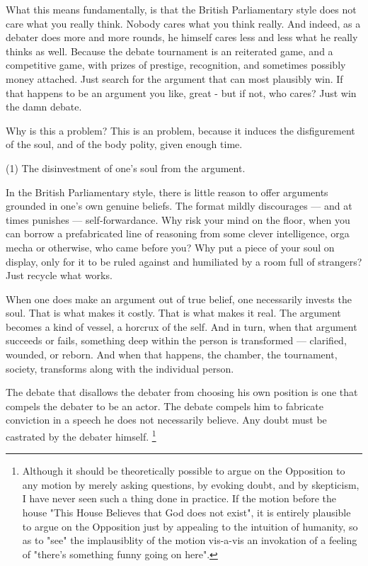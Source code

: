 \begin{itemize}
    What this means fundamentally, is that the British Parliamentary style does not care what you really think. Nobody cares what you think really. And indeed, as a debater does more and more rounds, he himself cares less and less what he really thinks as well. Because the debate tournament is an reiterated game, and a competitive game, with prizes of prestige, recognition, and sometimes possibly money attached. Just search for the argument that can most plausibly win. If that happens to be an argument you like, great - but if not, who cares? Just win the damn debate.
    
    Why is this a problem? This is an problem, because it induces the disfigurement of the soul, and of the body polity, given enough time.

(1) The disinvestment of one's soul from the argument. 

In the British Parliamentary style, there is little reason to offer arguments grounded in one’s own genuine beliefs. The format mildly discourages — and at times punishes — self-forwardance. Why risk your mind on the floor, when you can borrow a prefabricated line of reasoning from some clever intelligence, orga mecha or otherwise, who came before you? Why put a piece of your soul on display, only for it to be ruled against and humiliated by a room full of strangers? Just recycle what works.

When one does make an argument out of true belief, one necessarily invests the soul. That is what makes it costly. That is what makes it real. The argument becomes a kind of vessel, a horcrux of the self. And in turn, when that argument succeeds or fails, something deep within the person is transformed — clarified, wounded, or reborn. And when that happens, the chamber, the tournament, society, transforms along with the individual person.

The debate that disallows the debater from choosing his own position is one that compels the debater to be an actor. The debate compels him to fabricate conviction in a speech he does not necessarily believe. Any doubt must be castrated by the debater himself. \footnote{Although it should be theoretically possible to argue on the Opposition to any motion by merely asking questions, by evoking doubt, and by skepticism, I have never seen such a thing done in practice. If the motion before the house "This House Believes that God does not exist", it is entirely plausible to argue on the Opposition just by appealing to the intuition of humanity, so as to "see" the implausiblity of the motion vis-a-vis an invokation of a feeling of "there's something funny going on here".}


\end{itemize}
